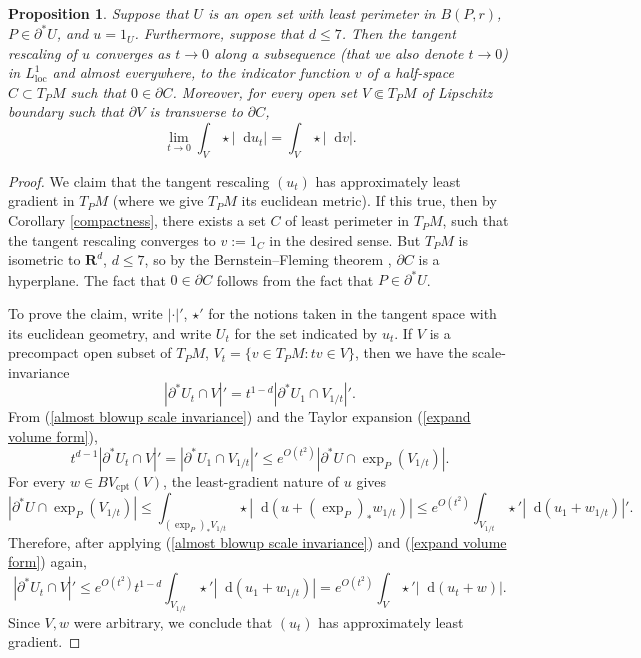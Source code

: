 \documentclass[reqno,10pt]{amsart}
\newcommand{\RR}{\mathbf{R}}
\newcommand*\dif{\mathop{}\!\mathrm{d}}
\newcommand{\loc}{\mathrm{loc}}
\newcommand{\cpt}{\mathrm{cpt}}
\newtheorem{proposition}[theorem]{Proposition}
\theoremstyle{definition}
\numberwithin{equation}{section}
\begin{document}
\begin{proposition}\label{blowup theorem}
Suppose that $U$ is an open set with least perimeter in $B(P, r)$, $P \in \partial^* U$, and $u = 1_U$.
Furthermore, suppose that $d \leq 7$.
Then the tangent rescaling of $u$ converges as $t \to 0$ along a subsequence (that we also denote $t \to 0$) in $L^1_\loc$ and almost everywhere, to the indicator function $v$ of a half-space $C \subset T_PM$ such that $0 \in \partial C$.
Moreover, for every open set $V \Subset T_PM$ of Lipschitz boundary such that $\partial V$ is transverse to $\partial C$,
$$\lim_{t \to 0} \int_V \star |\dif u_t| = \int_V \star |\dif v|.$$
\end{proposition}
\begin{proof}
We claim that the tangent rescaling $(u_t)$ has approximately least gradient in $T_PM$ (where we give $T_PM$ its euclidean metric). If this true, then by Corollary \ref{compactness}, there exists a set $C$ of least perimeter in $T_PM$, such that the tangent rescaling converges to $v := 1_C$ in the desired sense.
But $T_PM$ is isometric to $\RR^d$, $d \leq 7$, so by the Bernstein--Fleming theorem \cite[Theorem 17.3]{Giusti77}, $\partial C$ is a hyperplane.
The fact that $0 \in \partial C$ follows from the fact that $P \in \partial^* U$.

To prove the claim, write $|\cdot|'$, $\star'$ for the notions taken in the tangent space with its euclidean geometry, and write $U_t$ for the set indicated by $u_t$.
If $V$ is a precompact open subset of $T_PM$, $V_t = \{v \in T_PM: tv \in V\}$, then we have the scale-invariance
\begin{equation}\label{almost blowup scale invariance}
|\partial^* U_t \cap V|' = t^{1 - d}|\partial^* U_1 \cap V_{1/t}|'.
\end{equation}
From (\ref{almost blowup scale invariance}) and the Taylor expansion (\ref{expand volume form}),
$$t^{d - 1} |\partial^* U_t \cap V|' = |\partial^* U_1 \cap V_{1/t}|' \leq e^{O(t^2)} |\partial^* U \cap \exp_P(V_{1/t})|.$$
For every $w \in BV_\cpt(V)$, the least-gradient nature of $u$ gives
$$|\partial^* U \cap \exp_P(V_{1/t})| \leq \int_{(\exp_P)_* V_{1/t}} \star |\dif(u + (\exp_P)_* w_{1/t})| \leq e^{O(t^2)} \int_{V_{1/t}} \star'|\dif(u_1 + w_{1/t})|'.$$
Therefore, after applying (\ref{almost blowup scale invariance}) and (\ref{expand volume form}) again,
$$|\partial^* U_t \cap V|' \leq e^{O(t^2)} t^{1 - d} \int_{V_{1/t}} \star' |\dif (u_1 + w_{1/t})| = e^{O(t^2)} \int_V \star' |\dif (u_t + w)|.$$
Since $V,w$ were arbitrary, we conclude that $(u_t)$ has approximately least gradient.
\end{proof}
\end{document}
